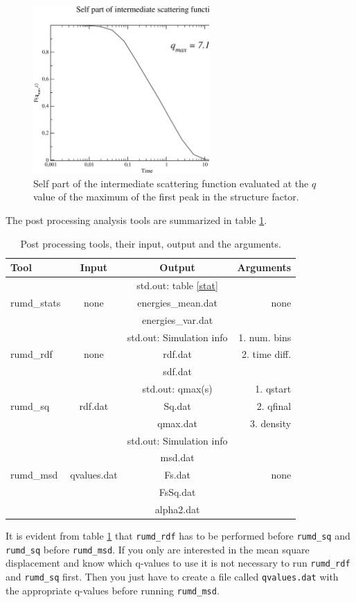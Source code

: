 \begin{figure}[!ht]
\centering
\includegraphics[width=0.6\textwidth]{level1/LJFs}
\caption{Self part of the intermediate scattering function evaluated
  at the $q$ value of the maximum of the first peak in the structure
  factor.}\label{Fs} 
\end{figure}
The post processing analysis tools are summarized in table \ref{pp}.
 \begin{table}
   \begin{center}
  \begin{tabular}{l c c r}
  \hline \hline
  Tool & Input & Output & Arguments\\
  \hline
  \multirow{3}{*}{rumd\_stats}
   &  & std.out: table \ref{stat} &  \\
   & none & energies\_mean.dat & none \\
   & & energies\_var.dat &  \\
  \hline
  \multirow{3}{*}{rumd\_rdf}
   &  & std.out: Simulation info & 1. num. bins \\
   & none & rdf.dat & 2. time diff. \\
   &  & sdf.dat &  \\
  \hline
  \multirow{3}{*}{rumd\_sq}
   &  & std.out: qmax(s) & 1. qstart \\
   & rdf.dat & Sq.dat & 2. qfinal \\
   &  & qmax.dat & 3. density \\
  \hline
  \multirow{5}{*}{rumd\_msd}
   &  & std.out: Simulation info & \\
   &  & msd.dat  & \\
   & qvalues.dat &  Fs.dat & none\\
   &  &  FsSq.dat & \\
   &  &  alpha2.dat & \\
  \hline \hline
  \end{tabular}
  \caption{Post processing tools, their input, output and the
    arguments.}\label{pp}
\end{center}
 \end{table}
It is evident from table \ref{pp} that \verb=rumd_rdf= has to be
performed before \verb=rumd_sq= and \verb=rumd_sq= before
\verb=rumd_msd=. If you only are interested in the mean square
displacement and know which q-values to use it is not necessary to run
\verb=rumd_rdf= and \verb=rumd_sq= first. Then you just have to create
a file called \verb=qvalues.dat= with the appropriate q-values before
running \verb=rumd_msd=. 



